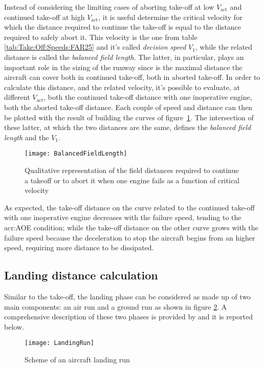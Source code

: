 \bigskip
\noindent
Instead of considering the limiting cases of aborting take-off at low $V_{\text{act}}$ and continued take-off at high $V_{\text{act}}$, it is useful determine the critical velocity for which the distance required to continue the take-off is equal to the distance required to safely abort it. This velocity is the one from table \ref{tab:Take:Off:Speeds:FAR25} and it's called \emph{decision speed} $V_1$, while the related distance is called the \emph{balanced field length}. The latter, in particular, plays an important role in the sizing of the runway since is the maximal distance the aircraft can cover both in continued take-off, both in 
aborted take-off. 
%
In order to calculate this distance, and the related velocity, it's possible to evaluate, at different $V_{\text{act}}$,  both the continued take-off distance with one inoperative engine, both the aborted take-off distance. Each couple of speed and distance can then be plotted with the result of building the curves of figure~\ref{fig:BalancedFieldLength}. The intersection of these latter, at which the two distances are the same, defines the \emph{balanced field length} and the $V_1$.
%
\begin{figure}[H]
\centering
\texttt{[image: BalancedFieldLength]}
\caption{Qualitative representation of the field distances required to continue a takeoff or to abort it when one
engine fails as a function of critical velocity}
\label{fig:BalancedFieldLength}
\end{figure}
%
\noindent
As expected, the take-off distance on the curve related to the continued take-off with one inoperative engine decreases with the failure speed, tending to the \gls{acr:AOE} condition; while the take-off distance on the other curve grows with the failure speed because the deceleration to stop the aircraft begins from an higher speed, requiring more distance to be dissipated.
%
\subsection{Landing distance calculation}
Similar to the take-off, the landing phase can be considered as made up of two main components: an air run and a ground run as shown in figure \ref{fig:LANDrun}. A comprehensive description of these two phases is provided by \cite{sforza2014commercial} and it is reported below.
%
\begin{figure}[!t]
\centering
\texttt{[image: LandingRun]}
\caption{Scheme of an aircraft landing run}
\label{fig:LANDrun}
\end{figure}

